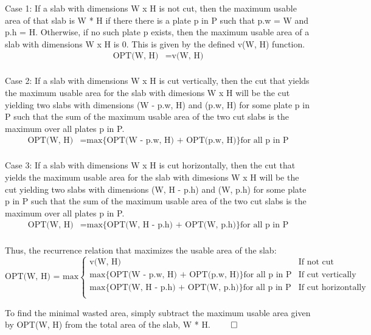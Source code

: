 \documentclass[11pt]{article}
\begin{document}
Case 1: If a slab with dimensions W x H is not cut, then the maximum usable area of that slab is W * H if there there is a plate p in P such that p.w = W and p.h = H. Otherwise, if no such plate p exists, then the maximum usable area of a slab with dimensions W x H is 0. This is given by the defined v(W, H) function.
\begin{align*}
\text{OPT(W, H)} &= \text{v(W, H)} \\
\end{align*}

Case 2: If a slab with dimensions W x H is cut vertically, then the cut that yields the maximum usable area for the slab with dimesions W x H will be the cut yielding two slabs with dimensions (W - p.w, H) and (p.w, H) for some plate p in P such that the sum of the maximum usable area of the two cut slabs is the maximum over all plates p in P.
\begin{align*}
\text{OPT(W, H)} &= \text{max\{OPT(W - p.w, H) + OPT(p.w, H)\} for all p in P} \\
\end{align*}

Case 3: If a slab with dimensions W x H is cut horizontally, then the cut that yields the maximum usable area for the slab with dimesions W x H will be the cut yielding two slabs with dimensions (W, H - p.h) and (W, p.h) for some plate p in P such that the sum of the maximum usable area of the two cut slabs is the maximum over all plates p in P.
\begin{align*}
\text{OPT(W, H)} &= \text{max\{OPT(W, H - p.h) + OPT(W, p.h)\} for all p in P} \\
\end{align*}

Thus, the recurrence relation that maximizes the usable area of the slab:
\[
\text{OPT(W, H) = max} 
\begin{cases} 
      \text{v(W, H)} & \text{If not cut}\\
	  \text{max\{OPT(W - p.w, H) + OPT(p.w, H)\} for all p in P} & \text{If cut vertically}\\
	  \text{max\{OPT(W, H - p.h) + OPT(W, p.h)\} for all p in P} & \text{If cut horizontally}\\
\end{cases}
\]

To find the minimal wasted area, simply subtract the maximum usable area given by OPT(W, H) from the total area of the slab, W * H. $\qed$
\end{document}
